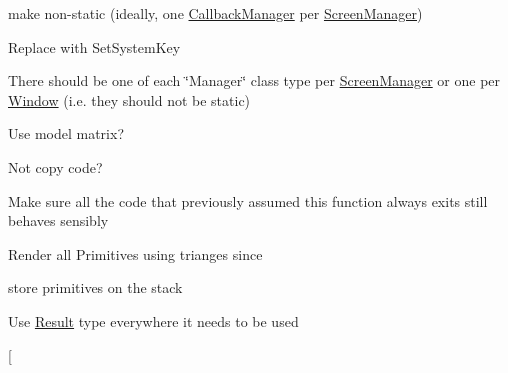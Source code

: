 \begin{DoxyRefList}
make non-\/static (ideally, one \hyperlink{classnta_1_1CallbackManager}{Callback\+Manager} per \hyperlink{classnta_1_1ScreenManager}{Screen\+Manager})  
\item[\label{todo__todo000002}%
\Hypertarget{todo__todo000002}%
Member \hyperlink{classnta_1_1Component_abed0426a01836855941e0236441eaf76}{nta\+:\+:Component\+:\+:E\+CS} ]Replace with Set\+System\+Key  
\item[\label{todo__todo000004}%
\Hypertarget{todo__todo000004}%
Class \hyperlink{classnta_1_1ErrorManager}{nta\+:\+:Error\+Manager} ]There should be one of each \char`\"{}\+Manager\char`\"{} class type per \hyperlink{classnta_1_1ScreenManager}{Screen\+Manager} or one per \hyperlink{classnta_1_1Window}{Window} (i.\+e. they should not be static)  
\item[\label{todo__todo000013}%
\Hypertarget{todo__todo000013}%
Member \hyperlink{structnta_1_1Glyph_a3b2afa4370140736d9d1b28de20d2105}{nta\+:\+:Glyph\+:\+:Glyph} (crvec4 pos\+Rect, crvec4 uv\+Rect, G\+Luint tex, float d, crvec4 col, float angle)]Use model matrix?  
\item[\label{todo__todo000018}%
\Hypertarget{todo__todo000018}%
Member \hyperlink{classnta_1_1IOManager_abbfd9da05b22aa488043a19344d38e0a}{nta\+:\+:I\+O\+Manager\+:\+:read\+File\+To\+Buffer} (crstring file\+Path, std\+::string \&buffer)]Not copy code?  
\item[\label{todo__todo000027}%
\Hypertarget{todo__todo000027}%
Member \hyperlink{classnta_1_1Logger_a22e0cfbb0e04de2c377cdd5297c39eee}{nta\+:\+:Logger\+:\+:write\+Error\+To\+Log} (crstring error, Error\+Type type=O\+T\+H\+ER)]Make sure all the code that previously assumed this function always exits still behaves sensibly  
\item[\label{todo__todo000029}%
\Hypertarget{todo__todo000029}%
Member \hyperlink{classnta_1_1PrimitiveBatch_a8b1bcf740a16d65a79566c0a9aebd117}{nta\+:\+:Primitive\+Batch\+:\+:create\+Render\+Batches} ()]Render all Primitives using trianges since  
\item[\label{todo__todo000010}%
\Hypertarget{todo__todo000010}%
Member \hyperlink{classnta_1_1PrimitiveBatch_a85b1ab0111c7d02d5899f47fe1946c4f}{nta\+:\+:Primitive\+Batch\+:\+:m\+\_\+primitives} ]store primitives on the stack  
\item[\label{todo__todo000005}%
\Hypertarget{todo__todo000005}%
Class \hyperlink{classnta_1_1Result}{nta\+:\+:Result$<$ T $>$} ]Use \hyperlink{classnta_1_1Result}{Result} type everywhere it needs to be used  
\item[\label{todo__todo000030}%

\end{DoxyRefList}
